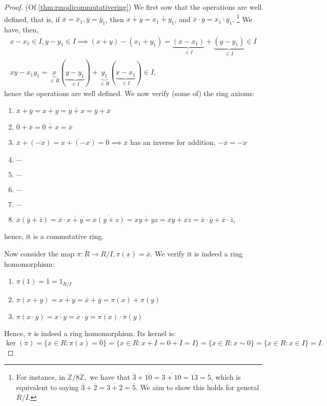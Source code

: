 \documentclass[12pt,oneside]{article}
\begin{document}
\begin{proof}(Of \cref{thm:rmodicommutativering})
  We first sow that the operations are well defined, that is, if $\bar{x} = \bar{x}_1, \bar{y} = \bar{y}_1$, then $\overline{x+y} = \overline{x_1+y_1}$, and $\overline{x} \cdot \overline{y} = \overline{x_1 \cdot y_1}$. \footnote{For instance, in $\mathbb{Z}/8 \mathbb{Z}, $ we have that $\overline{3} + \overline{10} = \overline{3 + 10}= \overline{13} = \overline{5}$, which is equivalent to saying $\overline{3} + \overline{2} = \overline{3+2} = \overline{5}$. We aim to show this holds for general $R/I$.}
  We have, then, \begin{align*}
    x - x_1 \in I, y - y_1 \in I \implies (x+y) - (x_1 + y_1) = \underbrace{(x - x_1)}_{\in I} + \underbrace{(y- y_1)}_{\in I} \in I\\
    xy - x_1 y_1 = \underbrace{x}_{\in R}(\underbrace{y - y_1}_{\in I}) + \underbrace{y_1}_{\in R}(\underbrace{x - x_1}_{\in I}) \in I,
  \end{align*}
  hence the operations are well defined. We now verify (some of) the ring axioms:
  \begin{enumerate}
    \item $\overline{x} + \overline{y} = \overline{x+y} = \overline{y+x} = \overline{y}+\overline{x}$
    \item $\overline{0} + \overline{x} = \overline{0+x} = \overline{x}$
    \item $\overline{x} + (\overline{-x}) = \overline{x+(-x)} = \overline{0} \implies \overline{x}$ has an inverse for addition, $- \overline{x} = \overline{-x}$
    \item $\cdots$
    \item $\cdots$
    \item $\cdots$
    \item $\cdots$
    \item $\overline{x}(\overline{y} + \overline{z}) = \overline{x} \cdot \overline{x+y} = \overline{x(y+z)} = \overline{xy+yz} = \overline{xy} + \overline{xz} = \overline{x} \cdot \overline{y} + \overline{x} \cdot \overline{z}$,
  \end{enumerate}
  hence, it is a commutative ring.

  Now consider the map $\pi: R \to R/I, \pi(x) = \overline{x}$. We verify it is indeed a ring homomorphism:
  \begin{enumerate}
    \item $\pi(1) = \overline{1} = 1_{R/I}$
    \item $\pi(x+y) = \overline{x+y} = \overline{x} + \overline{y} = \pi(x) + \pi (y)$
    \item $\pi (x\cdot y) = \overline{x\cdot y} = \overline{x} \cdot \overline{y} = \pi (x) \cdot \pi (y)$
  \end{enumerate}
  Hence, $\pi$ is indeed a ring homomorphism. Its kernel is:
  \[
  \ker (\pi) = \{x \in R : \pi(x) = \overline{0}\} = \{x \in R : x + I = 0 + I = I\} = \{x \in R: x \sim 0\}  = \{x \in R : x \in I\} = I.
  \]
\end{proof}
\end{document}
